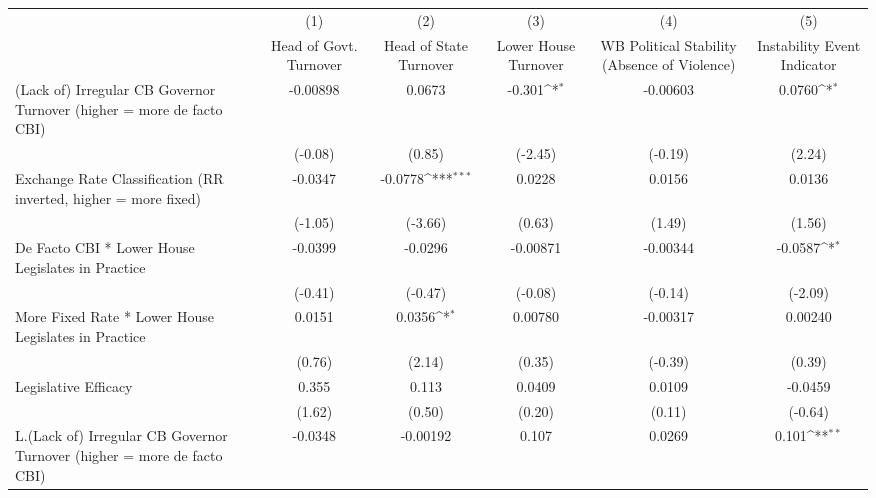 {
\def\sym#1{\ifmmode^{#1}\else\(^{#1}\)\fi}
\begin{longtable}{l*{5}{c}}
\toprule\endfirsthead\midrule\endhead\midrule\endfoot\endlastfoot
                &\multicolumn{1}{c}{(1)}&\multicolumn{1}{c}{(2)}&\multicolumn{1}{c}{(3)}&\multicolumn{1}{c}{(4)}&\multicolumn{1}{c}{(5)}\\
                &\multicolumn{1}{c}{Head of Govt. Turnover}&\multicolumn{1}{c}{Head of State Turnover}&\multicolumn{1}{c}{Lower House Turnover}&\multicolumn{1}{c}{WB Political Stability (Absence of Violence)}&\multicolumn{1}{c}{Instability Event Indicator}\\
\midrule
(Lack of) Irregular CB Governor Turnover (higher = more de facto CBI)& -0.00898         &   0.0673         &   -0.301\sym{*}  & -0.00603         &   0.0760\sym{*}  \\
                &  (-0.08)         &   (0.85)         &  (-2.45)         &  (-0.19)         &   (2.24)         \\
\addlinespace
Exchange Rate Classification (RR inverted, higher = more fixed)&  -0.0347         &  -0.0778\sym{***}&   0.0228         &   0.0156         &   0.0136         \\
                &  (-1.05)         &  (-3.66)         &   (0.63)         &   (1.49)         &   (1.56)         \\
\addlinespace
De Facto CBI * Lower House Legislates in Practice&  -0.0399         &  -0.0296         & -0.00871         & -0.00344         &  -0.0587\sym{*}  \\
                &  (-0.41)         &  (-0.47)         &  (-0.08)         &  (-0.14)         &  (-2.09)         \\
\addlinespace
More Fixed Rate * Lower House Legislates in Practice&   0.0151         &   0.0356\sym{*}  &  0.00780         & -0.00317         &  0.00240         \\
                &   (0.76)         &   (2.14)         &   (0.35)         &  (-0.39)         &   (0.39)         \\
\addlinespace
Legislative Efficacy&    0.355         &    0.113         &   0.0409         &   0.0109         &  -0.0459         \\
                &   (1.62)         &   (0.50)         &   (0.20)         &   (0.11)         &  (-0.64)         \\
\addlinespace
L.(Lack of) Irregular CB Governor Turnover (higher = more de facto CBI)&  -0.0348         & -0.00192         &    0.107         &   0.0269         &    0.101\sym{**} \\

\end{longtable}}
